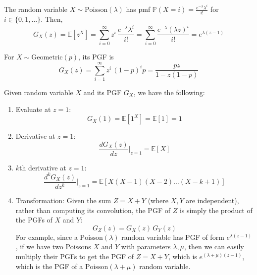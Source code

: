 \documentclass{article}
\begin{document}
      \begin{example}
        The random variable $X \sim \mathrm{Poisson}(\lambda)$ has pmf $\mathbb{P}(X = i) = \frac{e^{-\lambda} \lambda^i}{i!}$ for $i \in \{0, 1, \ldots\}$. Then, 
        \begin{equation}
          G_X (z) = \mathbb{E}[z^X] = \sum_{i=0}^\infty z^i \, \frac{e^{-\lambda} \lambda^i}{i!} = \sum_{i=0}^\infty \frac{e^{-\lambda} (\lambda z)^i}{i!} = e^{\lambda(z - 1)}
        \end{equation}
      \end{example}

      \begin{example}
        For $X \sim \mathrm{Geometric}(p)$, its PGF is 
        \begin{equation}
          G_X (z) = \sum_{i=1}^\infty z^i \, (1 - p)^i p = \frac{p z}{1 - z(1 - p)}
        \end{equation}
      \end{example}

      \begin{lemma}
        Given random variable $X$ and its PGF $G_X$, we have the following: 
        \begin{enumerate}
          \item Evaluate at $z = 1$: 
          \begin{equation}
            G_X (1) = \mathbb{E}[1^X] = \mathbb{E}[1] = 1
          \end{equation}
          \item Derivative at $z = 1$: 
          \begin{equation}
            \frac{d G_X (z)}{d z} \bigg|_{z = 1} = \mathbb{E}[X]
          \end{equation}
          \item $k$th derivative at $z = 1$: 
          \begin{equation}
            \frac{d^k G_X (z)}{d z^k} \bigg|_{z = 1} = \mathbb{E}[X (X-1) (X-2) \ldots (X-k +1)]
          \end{equation}
          \item Transformation: Given the sum $Z = X + Y$ (where $X, Y$ are independent), rather than computing its convolution, the PGF of $Z$ is simply the product of the PGFs of $X$ and $Y$: 
          \begin{equation}
            G_Z (z) = G_X (z) \, G_Y (z)
          \end{equation}
          For example, since a $\mathrm{Poisson}(\lambda)$ random variable has PGF of form $e^{\lambda (z - 1)}$, if we have two Poissons $X$ and $Y$ with parameters $\lambda, \mu$, then we can easily multiply their PGFs to get the PGF of $Z = X + Y$, which is $e^{(\lambda + \mu)(z - 1)}$, which is the PGF of a $\mathrm{Poisson}(\lambda + \mu)$ random variable. 
        \end{enumerate}
      \end{lemma}
\end{document}
